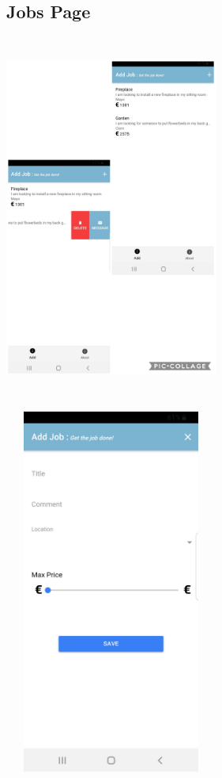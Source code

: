 \subsection{Jobs Page}
\begin{center}    
	\includegraphics[width=7cm, height=12cm]{img/job.jpg}
\end{center}
\begin{center}    
	\includegraphics[width=7cm, height=12cm]{img/addjob.jpg}
\end{center}

